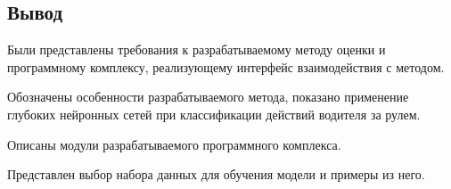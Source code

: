 \subsection*{Вывод}

Были представлены требования к разрабатываемому методу оценки и программному комплексу, реализующему интерфейс взаимодействия с методом.

Обозначены особенности разрабатываемого метода,
показано применение глубоких нейронных сетей при классификации действий водителя за рулем.

Описаны модули разрабатываемого программного комплекса.

Представлен выбор набора данных для обучения модели и примеры из него.

\pagebreak